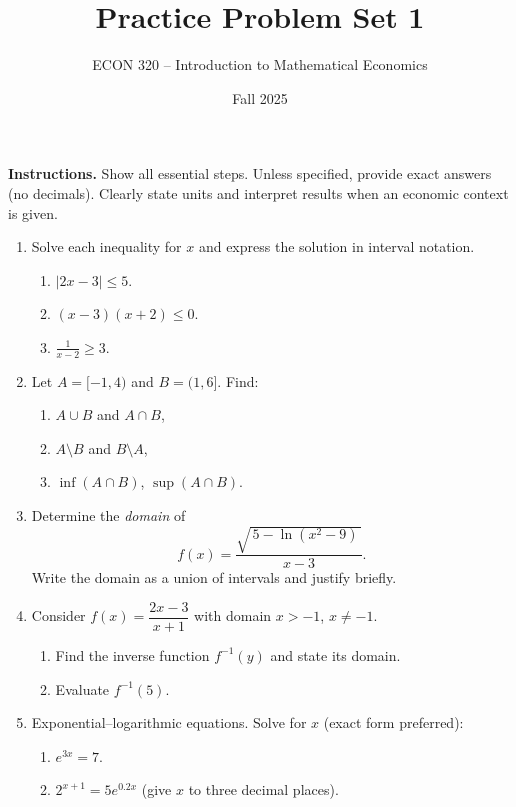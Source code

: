 \documentclass[12pt]{article}
\title{Practice Problem Set 1}
\author{ECON 320 -- Introduction to Mathematical Economics}
\date{Fall 2025}
\begin{document}
\maketitle

\noindent\textbf{Instructions.} Show all essential steps. Unless specified, provide exact answers (no decimals). Clearly state units and interpret results when an economic context is given.


\begin{enumerate}
\item Solve each inequality for $x$ and express the solution in interval notation.
\begin{enumerate}[label=(\alph*)]
  \item $\lvert 2x-3\rvert \le 5$.
  \item $(x-3)(x+2)\le 0$.
  \item $\displaystyle \frac{1}{x-2}\ge 3$.
\end{enumerate}

\item Let $A=[-1,4)$ and $B=(1,6]$. Find:
\begin{enumerate}[label=(\alph*)]
  \item $A\cup B$ and $A\cap B$,
  \item $A\setminus B$ and $B\setminus A$,
  \item $\inf(A\cap B)$, $\sup(A\cap B)$.
\end{enumerate}

\item Determine the \emph{domain} of
\[
f(x)=\frac{\sqrt{\,5-\ln(x^{2}-9)\,}}{x-3}.
\]
Write the domain as a union of intervals and justify briefly.

\item Consider $f(x)=\dfrac{2x-3}{x+1}$ with domain $x>-1$, $x\neq -1$.
\begin{enumerate}[label=(\alph*)]
  \item Find the inverse function $f^{-1}(y)$ and state its domain.
  \item Evaluate $f^{-1}(5)$.
\end{enumerate}

\item Exponential--logarithmic equations. Solve for $x$ (exact form preferred):
\begin{enumerate}[label=(\alph*)]
  \item $e^{3x}=7$.
  \item $2^{x+1}=5e^{0.2x}$ (give $x$ to three decimal places).
\end{enumerate}


\end{enumerate}
\end{document}
